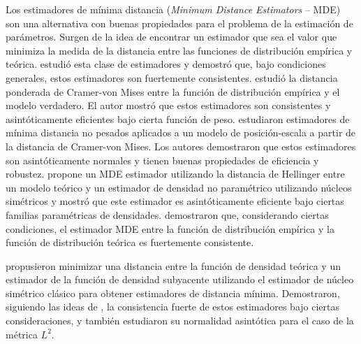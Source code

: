 Los estimadores de mínima distancia (\textit{Minimum Distance Estimators } -- MDE) son una  alternativa con buenas propiedades para el problema de la estimación de parámetros.
Surgen de la idea de encontrar un estimador que sea el valor que minimiza la medida de la distancia entre las funciones de distribución empírica y teórica.
\citet{wolfowitz1953, wolfowitz1957} estudió esta clase de estimadores y demostró que, bajo condiciones generales, estos estimadores son fuertemente consistentes. 
\citet{Boos1981} estudió la distancia ponderada de Cramer-von Mises entre la función de distribución empírica y el modelo verdadero.
El autor mostró que estos estimadores son consistentes y asintóticamente eficientes bajo cierta función de peso. \citet{HettmanSperger1994} estudiaron estimadores de mínima distancia no pesados aplicados a un modelo de posición-escala a partir de la distancia de Cramer-von Mises. Los autores demostraron que estos estimadores son asintóticamente normales y tienen buenas propiedades de eficiencia y robustez. \citet{beran1977} propone un MDE estimador utilizando la distancia de Hellinger entre un modelo teórico y un estimador de densidad no paramétrico utilizando núcleos simétricos y mostró que este estimador es asintóticamente eficiente bajo ciertas familias paramétricas de densidades. \citet{parr1982} demostraron que, considerando ciertas condiciones, el estimador MDE entre la función de distribución empírica y la función de distribución teórica es fuertemente consistente.

\citet{cao1995minimum} propusieron minimizar una distancia entre la función de densidad teórica y un estimador de la función de densidad subyacente utilizando el estimador de núcleo simétrico clásico para obtener estimadores de distancia mínima. Demostraron, siguiendo las ideas de \citet{parr1982}, la consistencia fuerte de estos estimadores bajo ciertas consideraciones, y también estudiaron su normalidad asintótica para el caso de la métrica $ L^2 $.


